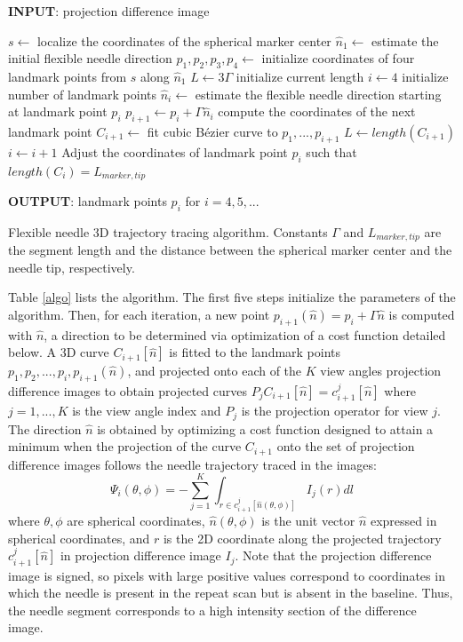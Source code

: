 \begin{table}
{\bf INPUT}: projection difference image 
\begin{algorithmic}[1]
  \STATE $s\leftarrow$ localize the coordinates of the spherical marker center
  \STATE $\hat{n}_1 \leftarrow$ estimate the initial flexible needle direction
  \STATE $p_1, p_2, p_3, p_4 \leftarrow$ initialize coordinates of four landmark points from $s$ along $\hat{n}_1$
  \STATE $L\leftarrow 3\Gamma$ initialize current length
  \STATE $i\leftarrow 4$ initialize number of landmark points
    \STATE $\hat{n}_{i} \leftarrow$ estimate the flexible needle direction starting at landmark point $p_i$
    \STATE $p_{i+1} \leftarrow p_i + \Gamma \hat{n}_{i}$ compute the coordinates of the next landmark point
    \STATE $C_{i+1}\leftarrow$ fit cubic B\'ezier curve to $p_1, ..., p_{i+1}$
    \STATE $L\leftarrow length(C_{i+1})$ 
    \STATE $i\leftarrow i+1$
  \ENDWHILE
  \STATE Adjust the coordinates of landmark point $p_i$ such that $length(C_i) = L_{marker,tip}$ 
\end{algorithmic}
{\bf OUTPUT}: landmark points $p_i$ for $i=4,5,...$ \\[0.01ex]
\hline
\caption{Flexible needle 3D trajectory tracing algorithm. Constants $\Gamma$ and $L_{marker,tip}$ are the segment length and the distance between the spherical marker center and the needle tip, respectively.}
\label{algo}
\end{table}

Table \ref{algo} lists the algorithm. The first five steps initialize the parameters of the algorithm. Then, for each iteration, a new point $p_{i+1}(\hat{n}) = p_i + \Gamma \hat{n}$ is computed with $\hat{n}$, a direction to be determined via optimization of a cost function detailed below.
A 3D curve $C_{i+1}[\hat{n}]$ is fitted to the landmark points $p_1, p_2, ..., p_i, p_{i+1}(\hat{n})$, and projected onto each of the $K$ view angles projection difference images to obtain projected curves $P_j C_{i+1}[\hat{n}] = c_{i+1}^j[\hat{n}]$ where $j=1,...,K$ is the view angle index and $P_j$ is the projection operator for view $j$.
The direction $\hat{n}$ is obtained by optimizing a cost function designed to attain a minimum when the projection of the curve $C_{i+1}$ onto the set of projection difference images follows the needle trajectory traced in the images:
\begin{equation}
\Psi_i(\theta, \phi) = -\sum_{j=1}^K{\int_{r \in c_{i+1}^j[\hat{n}(\theta, \phi)]} {I_j(r)dl}}
\end{equation}
where $ \theta, \phi$ are spherical coordinates, $ \hat{n}(\theta, \phi) $ is the unit vector $ \hat{n} $ expressed in spherical coordinates, and $r$ is the 2D coordinate along the projected trajectory $c_{i+1}^j[\hat{n}]$ in projection difference image $I_j$.  Note that the projection difference image is signed, so pixels with large positive values correspond to coordinates in which the needle is present in the repeat scan but is absent in the baseline. Thus, the needle segment corresponds to a high intensity section of the difference image.


